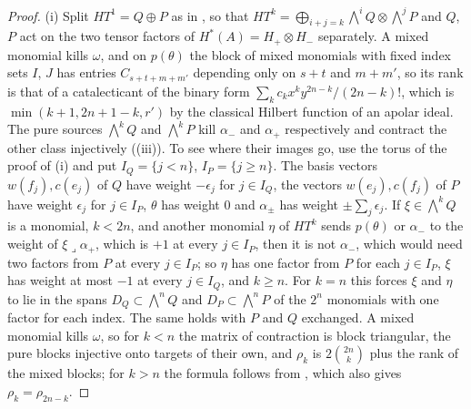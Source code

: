 \begin{proof}
(i) Split $HT^{1}=Q\oplus P$ as in , so that
$HT^{k}=\bigoplus_{i+j=k}\bigwedge^{i}Q\otimes\bigwedge^{j}P$ and $Q$, $P$ act
on the two tensor factors of $H^{*}(A)=H_{+}\otimes H_{-}$ separately. A mixed
monomial kills $\omega$, and on $p(\theta)$ the block of mixed monomials with
fixed index sets $I$, $J$ has entries $C_{s+t+m+m'}$ depending only on
$s+t$ and $m+m'$, so its rank is that of a catalecticant of the binary form
$\sum_{k}c_{k}x^{k}y^{2n-k}/(2n-k)!$, which is $\min(k+1,2n+1-k,r')$ by the
classical Hilbert function of an apolar ideal. The pure sources
$\bigwedge^{k}Q$ and $\bigwedge^{k}P$ kill $\alpha_{-}$ and $\alpha_{+}$
respectively and contract the other class injectively
((iii)). To see where their images go, use the torus of
the proof of (i) and put $I_{Q}=\{j<n\}$,
$I_{P}=\{j\ge n\}$. The basis vectors $w(f_{j}),c(e_{j})$ of $Q$ have weight
$-\epsilon_{j}$ for $j\in I_{Q}$, the vectors $w(e_{j}),c(f_{j})$ of $P$ have
weight $\epsilon_{j}$ for $j\in I_{P}$, $\theta$ has weight $0$ and
$\alpha_{\pm}$ has weight $\pm\sum_{j}\epsilon_{j}$. If $\xi\in\bigwedge^{k}Q$
is a monomial, $k<2n$, and another monomial $\eta$ of $HT^{k}$ sends
$p(\theta)$ or $\alpha_{-}$ to the weight of $\xi\lrcorner\alpha_{+}$, which is
$+1$ at every $j\in I_{P}$, then it is not $\alpha_{-}$, which would need two
factors from $P$ at every $j\in I_{P}$; so $\eta$ has one factor from $P$ for
each $j\in I_{P}$, $\xi$ has weight at most $-1$ at every $j\in I_{Q}$, and
$k\ge n$. For $k=n$ this forces $\xi$ and $\eta$ to lie in the spans
$D_{Q}\subset\bigwedge^{n}Q$ and $D_{P}\subset\bigwedge^{n}P$ of the $2^{n}$
monomials with one factor for each index. The same holds with $P$ and $Q$
exchanged. A mixed monomial kills
$\omega$, so for $k<n$ the matrix of contraction is block triangular, the pure
blocks injective onto targets of their own, and $\rho_{k}$ is $2\binom{2n}{k}$
plus the rank of the mixed blocks; for $k>n$ the formula follows from
, which also gives $\rho_{k}=\rho_{2n-k}$.


\end{proof}
